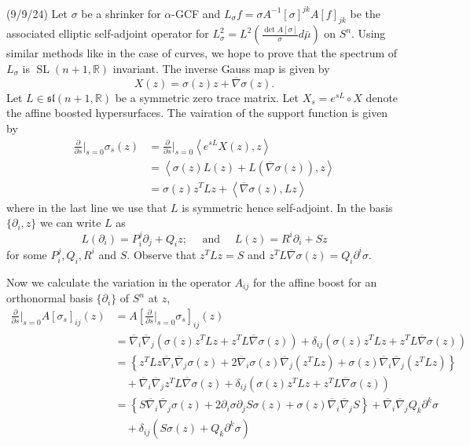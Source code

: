 \documentclass[12pt,a4paper]{article}
\newcommand{\R}{\mathbb{R}}
\begin{document}
(9/9/24) Let $ \sigma $ be a shrinker for $ \alpha $-GCF and $ L_{\sigma}f = \sigma A^{-1}[\sigma]^{jk}A[f]_{jk} $ be the associated elliptic self-adjoint operator for $ L^{2}_{\sigma} = L^{2} ( \frac{\det A[\sigma]}{\sigma} d \bar{\mu}) $ on $ S^{n} $. Using similar methods like in the case of curves, we hope to prove that the spectrum of $ L_{\sigma} $ is $ \operatorname{SL}(n+1, \R) $ invariant. The inverse Gauss map is given by 
\[ X(z) = \sigma(z)z+ \overline{\nabla}\sigma(z). \]
Let $ L \in \mathfrak{sl}(n+1, \R) $ be a symmetric zero trace matrix. Let $ X_{s} = e^{sL} \circ X $ denote the affine boosted hypersurfaces. The vairation of the support function is given by 
\begin{align*}
   \frac{\partial}{\partial s}\bigg|_{s=0} \sigma_{s}(z) & = \frac{\partial}{\partial s}\bigg|_{s=0}  \left< e^{sL}X(z),z \right> \\
   & = \left< \sigma(z)L(z) + L(\overline{\nabla}\sigma(z)),z \right> \\
   & = \sigma(z)z^{T}Lz + \left< \overline{\nabla}\sigma(z),Lz \right>
\end{align*}
where in the last line we use that $ L $ is symmetric hence self-adjoint.
In the basis $ \{\partial_{i},z\} $ we can write $ L $ as 
\[ L(\partial_{i}) = P^{j}_{i}\partial_{j}+ Q_{i}z;\quad \text{ and }\quad L(z) = R^{i}\partial_{i}+ Sz \]
for some $ P_{i}^{j},Q_{i},R^{i} $ and $ S $. Observe that $ z^{T}Lz = S $ and $ z^{T}L\overline{\nabla}\sigma(z) = Q_{i}\partial^{i}\sigma $.

Now we calculate the variation in the operator $ A_{ij} $ for the affine boost for an orthonormal basis $ \{\partial_{i}\} $ of $ S^{n} $ at $ z $, \begin{align*}
   \frac{\partial}{\partial s}\bigg|_{s=0} A[\sigma_{s}]_{ij}(z) & = A \left[\frac{\partial}{\partial s}\bigg|_{s=0} \sigma_{s} \right]_{ij}(z) \\
   & = \overline{\nabla}_{i}\overline{\nabla}_{j} \left(  \sigma(z)z^{T}Lz + z^{T}L\overline{\nabla}\sigma(z)\right) + \delta_{ij} (\sigma(z)z^{T}Lz + z^{T}L\overline{\nabla}\sigma(z)) \\
   & = \left\{z^{T}Lz\overline{\nabla}_{i}\overline{\nabla}_{j} \sigma(z) + 2\overline{\nabla}_{i}\sigma(z) \overline{\nabla}_{j}(z^{T}Lz) + \sigma(z)\overline{\nabla}_{i}\overline{\nabla}_{j}(z^{T}Lz)\right\} \\
   & \quad +\overline{\nabla}_{i}\overline{\nabla}_{j} z^{T}L \overline{\nabla}\sigma(z) + \delta_{ij}\left(  \sigma(z)z^{T}Lz + z^{T}L\overline{\nabla}\sigma(z)\right) \\
   & = \left\{S\overline{\nabla}_{i}\overline{\nabla}_{j} \sigma(z) + 2 \partial_{i}\sigma \partial_{j}S \sigma(z) + \sigma(z)\overline{\nabla}_{i}\overline{\nabla}_{j}S\right\} + \overline{\nabla}_{i}\overline{\nabla}_{j}Q_{k}\partial^{k}\sigma \\
   & \quad + \delta_{ij}\left( S\sigma(z) + Q_{k}\partial^{k}\sigma\right)
\end{align*}
\end{document}

